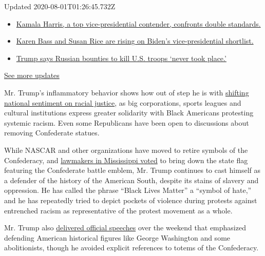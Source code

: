 Updated 2020-08-01T01:26:45.732Z

\begin{itemize}
\tightlist
\item
  \href{https://www.nytimes.com/2020/07/31/us/elections/biden-vs-trump.html?action=click\&pgtype=Article\&state=default\&region=MAIN_CONTENT_1\&context=storylines_live_updates\#link-29fdff45}{Kamala
  Harris, a top vice-presidential contender, confronts double
  standards.}
\item
  \href{https://www.nytimes.com/2020/07/31/us/elections/biden-vs-trump.html?action=click\&pgtype=Article\&state=default\&region=MAIN_CONTENT_1\&context=storylines_live_updates\#link-13ec3d9c}{Karen
  Bass and Susan Rice are rising on Biden's vice-presidential
  shortlist.}
\item
  \href{https://www.nytimes.com/2020/07/31/us/elections/biden-vs-trump.html?action=click\&pgtype=Article\&state=default\&region=MAIN_CONTENT_1\&context=storylines_live_updates\#link-49e9a016}{Trump
  says Russian bounties to kill U.S. troops `never took place.'}
\end{itemize}

\href{https://www.nytimes.com/2020/07/31/us/elections/biden-vs-trump.html?action=click\&pgtype=Article\&state=default\&region=MAIN_CONTENT_1\&context=storylines_live_updates}{See
more updates}

Mr. Trump's inflammatory behavior shows how out of step he is with
\href{https://www.nytimes.com/interactive/2020/06/10/upshot/black-lives-matter-attitudes.html}{shifting
national sentiment on racial justice}, as big corporations, sports
leagues and cultural institutions express greater solidarity with Black
Americans protesting systemic racism. Even some Republicans have been
open to discussions about removing Confederate statues.

While NASCAR and other organizations have moved to retire symbols of the
Confederacy, and
\href{https://www.nytimes.com/2020/06/28/us/mississippi-flag-confederacy.html?searchResultPosition=4}{lawmakers
in Mississippi voted} to bring down the state flag featuring the
Confederate battle emblem, Mr. Trump continues to cast himself as a
defender of the history of the American South, despite its stains of
slavery and oppression. He has called the phrase ``Black Lives Matter''
a ``symbol of hate,'' and he has repeatedly tried to depict pockets of
violence during protests against entrenched racism as representative of
the protest movement as a whole.

Mr. Trump also
\href{https://www.nytimes.com/2020/07/04/us/politics/trump-mt-rushmore.html}{delivered
official speeches} over the weekend that emphasized defending American
historical figures like George Washington and some abolitionists, though
he avoided explicit references to totems of the Confederacy.

